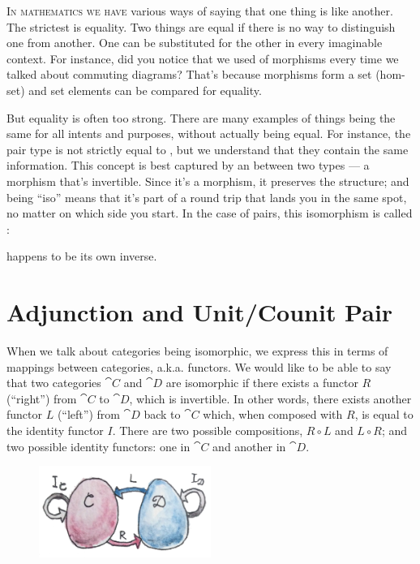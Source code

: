
\lettrine[lhang=0.17]{I}{n mathematics we have} various ways of saying that one thing is like
another. The strictest is equality. Two things are equal if there is no
way to distinguish one from another. One can be substituted for the
other in every imaginable context. For instance, did you notice that we
used  of morphisms every time we talked about commuting
diagrams? That's because morphisms form a set (hom-set) and set elements
can be compared for equality.

But equality is often too strong. There are many examples of things
being the same for all intents and purposes, without actually being
equal. For instance, the pair type  is not
strictly equal to , but we understand that they
contain the same information. This concept is best captured by an
 between two types --- a morphism that's invertible.
Since it's a morphism, it preserves the structure; and being ``iso''
means that it's part of a round trip that lands you in the same spot, no
matter on which side you start. In the case of pairs, this isomorphism
is called :

 happens to be its own inverse.

\section{Adjunction and Unit/Counit Pair}

When we talk about categories being isomorphic, we express this in terms
of mappings between categories, a.k.a. functors. We would like to be
able to say that two categories $\cat{C}$ and $\cat{D}$ are isomorphic if
there exists a functor $R$ (``right'') from $\cat{C}$ to $\cat{D}$,
which is invertible. In other words, there exists another functor
$L$ (``left'') from $\cat{D}$ back to $\cat{C}$ which, when
composed with $R$, is equal to the identity functor $I$.
There are two possible compositions, $R \circ L$ and
$L \circ R$; and two possible identity functors: one in $\cat{C}$
and another in $\cat{D}$.

\begin{figure}[H]
  \centering
  \includegraphics[width=0.5\textwidth]{images/adj-1.jpg}
\end{figure}

